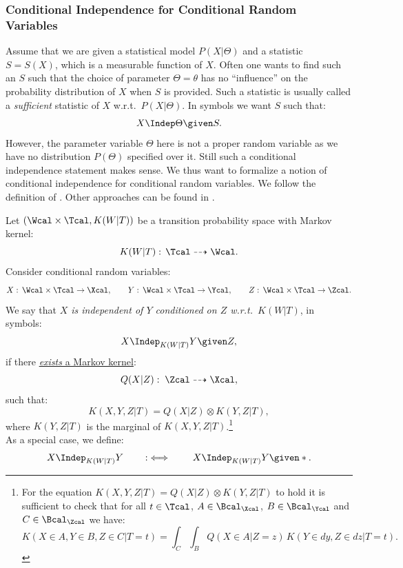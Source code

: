 \subsubsection{Conditional Independence for Conditional Random Variables}

\begin{Motivation}
    Assume that we are given a statistical model $P(X|\Theta)$ and a statistic $S=S(X)$, which is a measurable function of $X$.
    Often one wants to find such an $S$ such that the choice of parameter $\Theta=\theta$ has no ``influence'' on the probability distribution of $X$ when $S$ is provided. Such a statistic is usually called a \emph{sufficient} statistic of $X$ w.r.t.\ $P(X|\Theta)$. In symbols we want $S$ such that:
    \[ X \Indep \Theta \given S.\]
    However, the parameter variable $\Theta$ here is not a proper random variable as we have no distribution $P(\Theta)$ specified over it. Still such a conditional independence statement makes sense. We thus want to formalize a notion of conditional independence for conditional random variables. We follow the definition of \cite{For21}.
    Other approaches can be found in \cite{Daw79, Daw80, Daw01, CD17, RERS17, FM20}.
\end{Motivation}


\begin{Def}
\label{cond-indep-markov-kernels-def}
Let $(\Wcal \times \Tcal, K(W|T))$ be a transition probability space with Markov kernel:
\[K(W|T): \, \Tcal \dashrightarrow  \Wcal.\]
Consider conditional random variables: 
\[ X:\, \Wcal \times \Tcal \to \Xcal, \qquad Y:\,\Wcal \times \Tcal \to \Ycal, \qquad
Z:\,\Wcal \times \Tcal \to \Zcal.\]
We say that \emph{$X$ is independent of $Y$ conditioned on $Z$ w.r.t.\ $K(W|T)$}, in symbols:
\[X \Indep_{K(W|T)} Y \given Z, \]
if there \underline{\emph{exists} a Markov kernel}: 
\[ Q(X|Z):\; \Zcal \dashrightarrow \Xcal,\]
such that:
\[ K(X,Y,Z|T) = Q(X|Z) \otimes K(Y,Z|T),\]
where $K(Y,Z|T)$ is the marginal of $K(X,Y,Z|T)$.\footnote{
For the equation $K(X,Y,Z|T) = Q(X|Z) \otimes K(Y,Z|T)$ to hold it is sufficient to check that for all $t \in \Tcal$, $A \in \Bcal_\Xcal$, $B \in \Bcal_\Ycal$ and $C \in \Bcal_\Zcal$ we have:
\[ K(X \in A, Y \in B, Z \in C |T=t) = \int_C \int_B  Q(X \in A|Z=z)\, K(Y \in dy, Z \in dz|T=t). \]
}\\
As a special case, we define:
\[X \Indep_{K(W|T)} Y \qquad :\iff \qquad X \Indep_{K(W|T)} Y \given \ast. \]
\end{Def}



